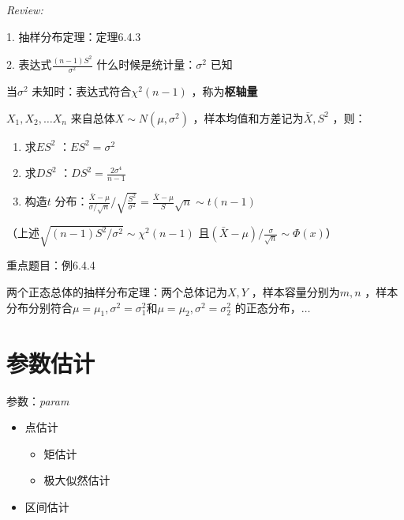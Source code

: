 \textit{Review:}

1. 抽样分布定理：定理6.4.3

2. 表达式$\frac{\left( n-1 \right)S^2 }{\sigma^2 }$ 什么时候是统计量：$\sigma^2 $ 已知

当$\sigma^2 $ 未知时：表达式符合$\chi^2 \left( n-1 \right)$ ，称为\textbf{枢轴量}
\begin{cor}
    $X_1,X_2,\ldots X_{n}$ 来自总体$X\sim N\left( \mu,\sigma^2  \right)$ ，样本均值和方差记为$\bar{X},S^2 $ ，则：
    \begin{enumerate}
        \item 求$ES^2 $ ：$ES^2 =\sigma^2 $ 
        \item 求$DS^2 $ ：$DS^2 =\frac{2\sigma^4 }{n-1}$
        \item 构造$t$ 分布：$\frac{\bar{X}-\mu}{\sigma /\sqrt{n}}/\sqrt{\frac{S^2 }{\sigma^2 }}=\frac{\bar{X}-\mu}{S}\sqrt{n}\sim t\left( n-1 \right)$
    \end{enumerate}
    （上述$\sqrt{\left( n-1 \right)S^2 /\sigma^2} \sim \chi^2 \left( n-1 \right)$ 且$(\bar{X}-\mu) /\frac{\sigma}{\sqrt{n}}\sim \Phi\left( x \right)$）
\end{cor}
重点题目：例6.4.4
\begin{cor}
    两个正态总体的抽样分布定理：两个总体记为$X,Y$ ，样本容量分别为$m,n$ ，样本分布分别符合$\mu=\mu_1,\sigma^2 =\sigma_1^2 $和$\mu=\mu_2,\sigma^2 =\sigma_2^2 $ 的正态分布，$\ldots $
\end{cor}
\section{参数估计}%
\label{sec:参数估计}
参数：\textit{param}
\begin{itemize}
    \item 点估计
    \begin{itemize}
        \item 矩估计
        \item 极大似然估计
    \end{itemize}
    \item 区间估计
\end{itemize} 
